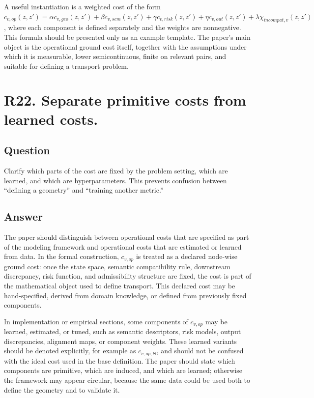 \documentclass[11pt,a4paper]{article}
\begin{document}
A useful instantiation is a weighted cost of the form \(c_{v,op}(z,z') = \alpha c_{v,geo}(z,z') + \beta c_{v,sem}(z,z') + \gamma c_{v,risk}(z,z') + \eta c_{v,out}(z,z') + \lambda \chi_{incompat,v}(z,z')\), where each component is defined separately and the weights are nonnegative. This formula should be presented only as an example template. The paper's main object is the operational ground cost itself, together with the assumptions under which it is measurable, lower semicontinuous, finite on relevant pairs, and suitable for defining a transport problem.

\section*{R22. Separate primitive costs from learned costs.}

\subsection*{Question}

Clarify which parts of the cost are fixed by the problem setting, which are learned, and which are hyperparameters. This prevents confusion between ``defining a geometry'' and ``training another metric.''

\subsection*{Answer}

The paper should distinguish between operational costs that are specified as part of the modeling framework and operational costs that are estimated or learned from data. In the formal construction, \(c_{v,op}\) is treated as a declared node-wise ground cost: once the state space, semantic compatibility rule, downstream discrepancy, risk function, and admissibility structure are fixed, the cost is part of the mathematical object used to define transport. This declared cost may be hand-specified, derived from domain knowledge, or defined from previously fixed components.

In implementation or empirical sections, some components of \(c_{v,op}\) may be learned, estimated, or tuned, such as semantic descriptors, risk models, output discrepancies, alignment maps, or component weights. These learned variants should be denoted explicitly, for example as \(c_{v,op,\Theta}\), and should not be confused with the ideal cost used in the base definition. The paper should state which components are primitive, which are induced, and which are learned; otherwise the framework may appear circular, because the same data could be used both to define the geometry and to validate it.
\end{document}
